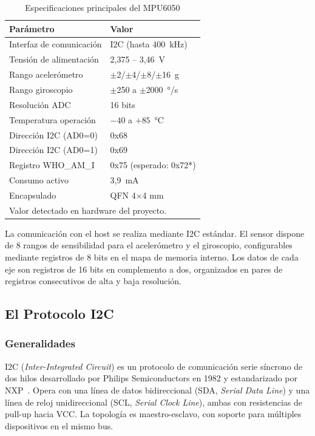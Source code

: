 \documentclass[10pt,twocolumn,a4paper]{article}
\begin{document}
\begin{table}[H]
\centering
\caption{Especificaciones principales del MPU6050}
\label{tab:specs}
\scriptsize
\begin{tabular}{p{3.0cm}p{3.5cm}}
\toprule
\textbf{Parámetro} & \textbf{Valor} \\
\midrule
Interfaz de comunicación & I2C (hasta 400~kHz) \\
Tensión de alimentación & 2,375 -- 3,46~V \\
Rango acelerómetro & $\pm$2/$\pm$4/$\pm$8/$\pm$16~g \\
Rango giroscopio & $\pm$250 a $\pm$2000~°/s \\
Resolución ADC & 16 bits \\
Temperatura operación & $-40$ a $+85$~°C \\
Dirección I2C (AD0=0) & 0x68 \\
Dirección I2C (AD0=1) & 0x69 \\
Registro WHO\_AM\_I & 0x75 (esperado: 0x72*) \\
Consumo activo & 3,9~mA \\
Encapsulado & QFN 4$\times$4 mm \\
\bottomrule
\multicolumn{2}{l}{\tiny *Valor detectado en hardware del proyecto.} \\
\end{tabular}
\end{table}

La comunicación con el host se realiza mediante I2C estándar. El sensor
dispone de 8 rangos de sensibilidad para el acelerómetro y el
giroscopio, configurables mediante registros de 8 bits en el mapa de
memoria interno. Los datos de cada eje son registros de 16 bits en
complemento a dos, organizados en pares de registros consecutivos de
alta y baja resolución.

\subsection{El Protocolo I2C}

\subsubsection{Generalidades}

I2C (\textit{Inter-Integrated Circuit}) es un protocolo de comunicación
serie síncrono de dos hilos desarrollado por Philips Semiconductors en
1982 y estandarizado por NXP~\cite{nxp_i2c}. Opera con una línea de
datos bidireccional (SDA, \textit{Serial Data Line}) y una línea de
reloj unidireccional (SCL, \textit{Serial Clock Line}), ambas con
resistencias de pull-up hacia VCC. La topología es maestro-esclavo,
con soporte para múltiples dispositivos en el mismo bus.
\end{document}
